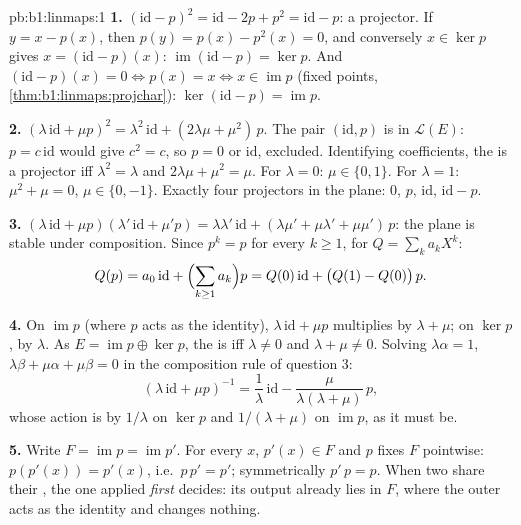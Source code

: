 \begin{solution}{pb:b1:linmaps:1}
\textbf{1.} $(\mathrm{id} - p)^2 = \mathrm{id} - 2p + p^2 =
\mathrm{id} - p$: a projector. If $y = x - p(x)$, then $p(y) =
p(x) - p^2(x) = 0$, and conversely $x \in \ker p$ gives $x =
(\mathrm{id} - p)(x)$: $\operatorname{im}(\mathrm{id} - p) = \ker
p$. And $(\mathrm{id} - p)(x) = 0 \iff p(x) = x \iff x \in
\operatorname{im} p$ (fixed points,
\cref{thm:b1:linmaps:projchar}): $\ker(\mathrm{id} - p) =
\operatorname{im} p$.

\textbf{2.} $(\lambda\,\mathrm{id} + \mu p)^2 =
\lambda^2\,\mathrm{id} + (2\lambda\mu + \mu^2)\,p$. The pair
$(\mathrm{id}, p)$ is  in $\mathcal{L}(E)$: $p = c\,
\mathrm{id}$ would give $c^2 = c$, so $p = 0$ or $\mathrm{id}$,
excluded. Identifying coefficients, the  is a projector iff
$\lambda^2 = \lambda$ and $2\lambda\mu + \mu^2 = \mu$. For
$\lambda = 0$: $\mu \in \{0, 1\}$. For $\lambda = 1$: $\mu^2 +
\mu = 0$, $\mu \in \{0, -1\}$. Exactly four projectors in the
plane: $0$, $p$, $\mathrm{id}$, $\mathrm{id} - p$.

\textbf{3.} $(\lambda\,\mathrm{id} + \mu p)(\lambda'\,\mathrm{id}
+ \mu' p) = \lambda\lambda'\,\mathrm{id} + (\lambda\mu' +
\mu\lambda' + \mu\mu')\,p$: the plane is stable under
composition. Since $p^k = p$ for every $k \geq 1$, for $Q =
\sum_k a_k X^k$:
\[
Q(p) = a_0\,\mathrm{id} + \Bigl(\sum_{k \geq 1} a_k\Bigr) p
= Q(0)\,\mathrm{id} + \bigl(Q(1) - Q(0)\bigr)\,p .
\]

\textbf{4.} On $\operatorname{im} p$ (where $p$ acts as the
identity), $\lambda\,\mathrm{id} + \mu p$ multiplies by $\lambda
+ \mu$; on $\ker p$, by $\lambda$. As $E = \operatorname{im} p
\oplus \ker p$, the  is  iff $\lambda \neq 0$ and
$\lambda + \mu \neq 0$. Solving $\lambda\alpha = 1$,
$\lambda\beta + \mu\alpha + \mu\beta = 0$ in the composition rule
of question 3:
\[
(\lambda\,\mathrm{id} + \mu p)^{-1}
= \frac1\lambda\,\mathrm{id} -
\frac{\mu}{\lambda(\lambda + \mu)}\,p ,
\]
whose action is by $1/\lambda$ on $\ker p$ and $1/(\lambda +
\mu)$ on $\operatorname{im} p$, as it must be.

\textbf{5.} Write $F = \operatorname{im} p = \operatorname{im}
p'$. For every $x$, $p'(x) \in F$ and $p$ fixes $F$ pointwise:
$p(p'(x)) = p'(x)$, i.e.\ $p\,p' = p'$; symmetrically $p'\,p =
p$. When two  share their , the one applied
\emph{first} decides: its output already lies in $F$, where the
outer  acts as the identity and changes nothing.


\end{solution}
